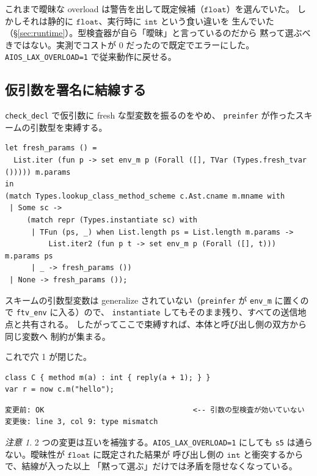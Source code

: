 \documentclass[11pt,a4paper]{ltjsarticle}
\theoremstyle{definition}
\theoremstyle{remark}
\newtheorem{remark}{注意}
\newcommand{\ty}[1]{\ensuremath{\mathtt{#1}}}
\begin{document}
これまで曖昧な overload は警告を出して既定候補（\ty{float}）を選んでいた。
しかしそれは静的に \ty{float}、実行時に \ty{int} という食い違いを
生んでいた（\S\ref{sec:runtime}）。型検査器が自ら「曖昧」と言っているのだから
黙って選ぶべきではない。実測でコストが 0 だったので既定でエラーにした。
\texttt{AIOS\_LAX\_OVERLOAD=1} で従来動作に戻せる。

\subsection{仮引数を署名に結線する}

\texttt{check\_decl} で仮引数に fresh な型変数を振るのをやめ、
\texttt{preinfer} が作ったスキームの引数型を束縛する。

\begin{lstlisting}
let fresh_params () =
  List.iter (fun p -> set env_m p (Forall ([], TVar (Types.fresh_tvar ())))) m.params
in
(match Types.lookup_class_method_scheme c.Ast.cname m.mname with
 | Some sc ->
     (match repr (Types.instantiate sc) with
      | TFun (ps, _) when List.length ps = List.length m.params ->
          List.iter2 (fun p t -> set env_m p (Forall ([], t))) m.params ps
      | _ -> fresh_params ())
 | None -> fresh_params ());
\end{lstlisting}

スキームの引数型変数は generalize されていない（\texttt{preinfer} が
\texttt{env\_m} に置くので \texttt{ftv\_env} に入る）ので、
\texttt{instantiate} してもそのまま残り、すべての送信地点と共有される。
したがってここで束縛すれば、本体と呼び出し側の双方から同じ変数へ
制約が集まる。

これで穴 1 が閉じた。

\begin{lstlisting}[language=AIPL]
class C { method m(a) : int { reply(a + 1); } }
var r = now c.m("hello");
\end{lstlisting}

\begin{lstlisting}[language={}]
変更前: OK                                  <-- 引数の型検査が効いていない
変更後: line 3, col 9: type mismatch
\end{lstlisting}

\begin{remark}
2 つの変更は互いを補強する。\texttt{AIOS\_LAX\_OVERLOAD=1} にしても
\texttt{s5} は通らない。曖昧性が \ty{float} に既定された結果が
呼び出し側の \ty{int} と衝突するからで、結線が入った以上
「黙って選ぶ」だけでは矛盾を隠せなくなっている。
\end{remark}
\end{document}
